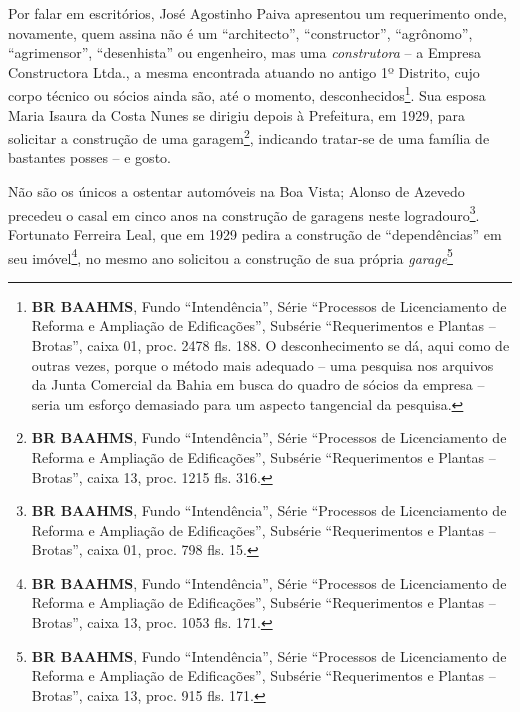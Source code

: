 Por falar em escritórios, José Agostinho Paiva apresentou um requerimento onde, novamente, quem assina não é um ``architecto'', ``constructor'', ``agrônomo'', ``agrimensor'', ``desenhista'' ou engenheiro, mas uma \textit{construtora} -- a Empresa Constructora Ltda., a mesma encontrada atuando no antigo 1º Distrito, cujo corpo técnico ou sócios ainda são, até o momento, desconhecidos\footnote{\textbf{BR BAAHMS}, Fundo ``Intendência'', Série ``Processos de Licenciamento de Reforma e Ampliação de Edificações'', Subsérie ``Requerimentos e Plantas -- Brotas'', caixa 01, proc. 2478 fls. 188. O desconhecimento se dá, aqui como de outras vezes, porque o método mais adequado -- uma pesquisa nos arquivos da Junta Comercial da Bahia em busca do quadro de sócios da empresa -- seria um esforço demasiado para um aspecto tangencial da pesquisa.}. Sua esposa Maria Isaura da Costa Nunes se dirigiu depois à Prefeitura, em 1929, para solicitar a construção de uma garagem\footnote{\textbf{BR BAAHMS}, Fundo ``Intendência'', Série ``Processos de Licenciamento de Reforma e Ampliação de Edificações'', Subsérie ``Requerimentos e Plantas -- Brotas'', caixa 13, proc. 1215 fls. 316.}, indicando tratar-se de uma família de bastantes posses -- e gosto.

Não são os únicos a ostentar automóveis na Boa Vista; Alonso de Azevedo precedeu o casal em cinco anos na construção de garagens neste logradouro\footnote{\textbf{BR BAAHMS}, Fundo ``Intendência'', Série ``Processos de Licenciamento de Reforma e Ampliação de Edificações'', Subsérie ``Requerimentos e Plantas -- Brotas'', caixa 01, proc. 798 fls. 15.}. Fortunato Ferreira Leal, que em 1929 pedira a construção de ``dependências'' em seu imóvel\footnote{\textbf{BR BAAHMS}, Fundo ``Intendência'', Série ``Processos de Licenciamento de Reforma e Ampliação de Edificações'', Subsérie ``Requerimentos e Plantas -- Brotas'', caixa 13, proc. 1053 fls. 171.}, no mesmo ano solicitou a construção de sua própria \textit{garage}\footnote{\textbf{BR BAAHMS}, Fundo ``Intendência'', Série ``Processos de Licenciamento de Reforma e Ampliação de Edificações'', Subsérie ``Requerimentos e Plantas -- Brotas'', caixa 13, proc. 915 fls. 171.}


